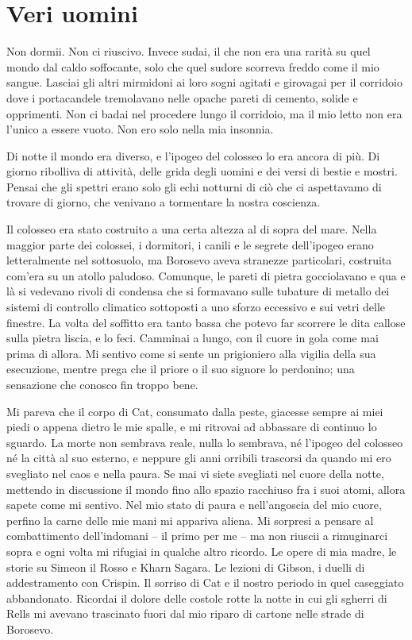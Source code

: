 \chapter{Veri uomini}

Non dormii. Non ci riuscivo. Invece sudai, il che non era una rarità su
quel mondo dal caldo soffocante, solo che quel sudore scorreva freddo
come il mio sangue. Lasciai gli altri mirmidoni ai loro sogni agitati e
girovagai per il corridoio dove i portacandele tremolavano nelle opache
pareti di cemento, solide e opprimenti. Non ci badai nel procedere lungo
il corridoio, ma il mio letto non era l'unico a essere vuoto. Non ero
solo nella mia insonnia.

Di notte il mondo era diverso, e l'ipogeo del colosseo lo era ancora di
più. Di giorno ribolliva di attività, delle grida degli uomini e dei
versi di bestie e mostri. Pensai che gli spettri erano solo gli echi
notturni di ciò che ci aspettavamo di trovare di giorno, che venivano a
tormentare la nostra coscienza.

Il colosseo era stato costruito a una certa altezza al di sopra del
mare. Nella maggior parte dei colossei, i dormitori, i canili e le
segrete dell'ipogeo erano letteralmente nel sottosuolo, ma Borosevo
aveva stranezze particolari, costruita com'era su un atollo paludoso.
Comunque, le pareti di pietra gocciolavano e qua e là si vedevano rivoli
di condensa che si formavano sulle tubature di metallo dei sistemi di
controllo climatico sottoposti a uno sforzo eccessivo e sui vetri delle
finestre. La volta del soffitto era tanto bassa che potevo far scorrere
le dita callose sulla pietra liscia, e lo feci. Camminai a lungo, con il
cuore in gola come mai prima di allora. Mi sentivo come si sente un
prigioniero alla vigilia della sua esecuzione, mentre prega che il
priore o il suo signore lo perdonino; una sensazione che conosco fin
troppo bene.

Mi pareva che il corpo di Cat, consumato dalla peste, giacesse sempre ai
miei piedi o appena dietro le mie spalle, e mi ritrovai ad abbassare di
continuo lo sguardo. La morte non sembrava reale, nulla lo sembrava, né
l'ipogeo del colosseo né la città al suo esterno, e neppure gli anni
orribili trascorsi da quando mi ero svegliato nel caos e nella paura. Se
mai vi siete svegliati nel cuore della notte, mettendo in discussione il
mondo fino allo spazio racchiuso fra i suoi atomi, allora sapete come mi
sentivo. Nel mio stato di paura e nell'angoscia del mio cuore, perfino
la carne delle mie mani mi appariva aliena. Mi sorpresi a pensare al
combattimento dell'indomani -- il primo per me -- ma non riuscii a
rimuginarci sopra e ogni volta mi rifugiai in qualche altro ricordo. Le
opere di mia madre, le storie su Simeon il Rosso e Kharn Sagara. Le
lezioni di Gibson, i duelli di addestramento con Crispin. Il sorriso di
Cat e il nostro periodo in quel caseggiato abbandonato. Ricordai il
dolore delle costole rotte la notte in cui gli sgherri di Rells mi
avevano trascinato fuori dal mio riparo di cartone nelle strade di
Borosevo.

